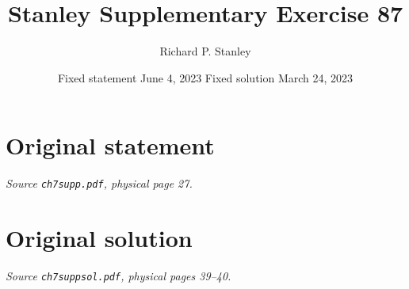 \documentclass[11pt,a4paper]{article}
\title{Stanley Supplementary Exercise 87}
\author{Richard P. Stanley}
\date{Fixed statement June 4, 2023 \qquad Fixed solution March 24, 2023}
\begin{document}
\maketitle
\section*{Original statement}
\noindent\emph{Source \texttt{ch7supp.pdf}, physical page 27.}\par\medskip

\clearpage
\section*{Original solution}
\noindent\emph{Source \texttt{ch7suppsol.pdf}, physical pages 39--40.}\par\medskip

\end{document}
